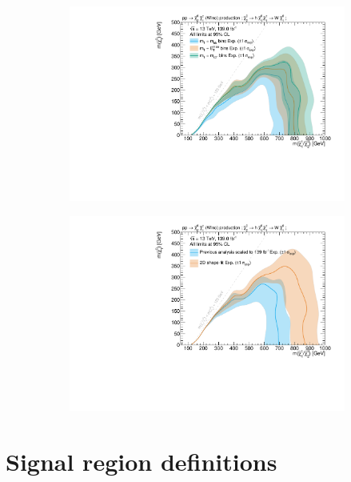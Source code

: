  \begin{figure}
	\centering
	\begin{subfigure}[b]{0.5\linewidth}
		\centering\includegraphics[width=1.0\textwidth]{HF/plot_binnings}
		\caption{\label{fig:plot_binnings}}
	\end{subfigure}\hfill
	\begin{subfigure}[b]{0.5\linewidth}
		\centering\includegraphics[width=1.0\textwidth]{HF/plot_2d_shapefit}
		\caption{}
	\end{subfigure}\hfill

	\caption{}
	\label{fig:results_HF_scans}
\end{figure}


\section{Signal region definitions}

